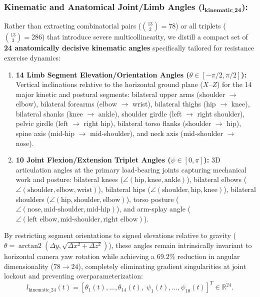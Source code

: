 \documentclass[runningheads]{llncs}
\begin{document}
\subsubsection{Kinematic and Anatomical Joint/Limb Angles ($\mathbf{l_{\text{kinematic\_24}}}$):}
Rather than extracting combinatorial pairs ($\binom{13}{2} = 78$) or all triplets ($\binom{13}{3} = 286$) that introduce severe multicollinearity, we distill a compact set of \textbf{24 anatomically decisive kinematic angles} specifically tailored for resistance exercise dynamics:
\begin{enumerate}
    \item \textbf{14 Limb Segment Elevation/Orientation Angles ($\theta \in [-\pi/2, \pi/2]$):} Vertical inclinations relative to the horizontal ground plane ($X\text{--}Z$) for the 14 major kinetic and postural segments: bilateral upper arms (shoulder $\to$ elbow), bilateral forearms (elbow $\to$ wrist), bilateral thighs (hip $\to$ knee), bilateral shanks (knee $\to$ ankle), shoulder girdle (left $\to$ right shoulder), pelvic girdle (left $\to$ right hip), bilateral torso flanks (shoulder $\to$ hip), spine axis (mid-hip $\to$ mid-shoulder), and neck axis (mid-shoulder $\to$ nose).
    \item \textbf{10 Joint Flexion/Extension Triplet Angles ($\psi \in [0, \pi]$):} 3D articulation angles at the primary load-bearing joints capturing mechanical work and posture: bilateral knees ($\angle(\text{hip}, \text{knee}, \text{ankle})$), bilateral elbows ($\angle(\text{shoulder}, \text{elbow}, \text{wrist})$), bilateral hips ($\angle(\text{shoulder}, \text{hip}, \text{knee})$), bilateral shoulders ($\angle(\text{hip}, \text{shoulder}, \text{elbow})$), torso posture ($\angle(\text{nose}, \text{mid-shoulder}, \text{mid-hip})$), and arm-splay angle ($\angle(\text{left elbow}, \text{mid-shoulder}, \text{right elbow})$).
\end{enumerate}
By restricting segment orientations to signed elevations relative to gravity ($\theta = \operatorname{arctan2}(\Delta y, \sqrt{\Delta x^2 + \Delta z^2})$), these angles remain intrinsically invariant to horizontal camera yaw rotation while achieving a 69.2\% reduction in angular dimensionality ($78 \to 24$), completely eliminating gradient singularities at joint lockout and preventing overparameterization:
\begin{equation}
    l_{\text{kinematic\_24}}(t) = \left[ \theta_1(t), \dots, \theta_{14}(t), \; \psi_1(t), \dots, \psi_{10}(t) \right]^T \in \mathbb{R}^{24}.
\end{equation}
\end{document}
